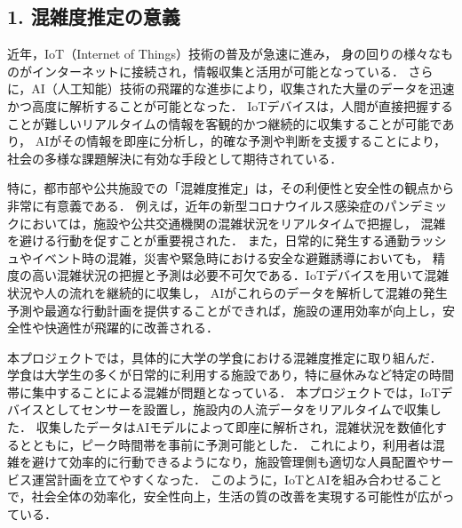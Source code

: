 \subsection*{1. 混雑度推定の意義}
近年，IoT（Internet of Things）技術の普及が急速に進み，
身の回りの様々なものがインターネットに接続され，情報収集と活用が可能となっている．
さらに，AI（人工知能）技術の飛躍的な進歩により，収集された大量のデータを迅速かつ高度に解析することが可能となった．
IoTデバイスは，人間が直接把握することが難しいリアルタイムの情報を客観的かつ継続的に収集することが可能であり，
AIがその情報を即座に分析し，的確な予測や判断を支援することにより，社会の多様な課題解決に有効な手段として期待されている．

特に，都市部や公共施設での「混雑度推定」は，その利便性と安全性の観点から非常に有意義である．
例えば，近年の新型コロナウイルス感染症のパンデミックにおいては，施設や公共交通機関の混雑状況をリアルタイムで把握し，
混雑を避ける行動を促すことが重要視された．
また，日常的に発生する通勤ラッシュやイベント時の混雑，災害や緊急時における安全な避難誘導においても，
精度の高い混雑状況の把握と予測は必要不可欠である．IoTデバイスを用いて混雑状況や人の流れを継続的に収集し，
AIがこれらのデータを解析して混雑の発生予測や最適な行動計画を提供することができれば，施設の運用効率が向上し，安全性や快適性が飛躍的に改善される．

本プロジェクトでは，具体的に大学の学食における混雑度推定に取り組んだ．
学食は大学生の多くが日常的に利用する施設であり，特に昼休みなど特定の時間帯に集中することによる混雑が問題となっている．
本プロジェクトでは，IoTデバイスとしてセンサーを設置し，施設内の人流データをリアルタイムで収集した．
収集したデータはAIモデルによって即座に解析され，混雑状況を数値化するとともに，ピーク時間帯を事前に予測可能とした．
これにより，利用者は混雑を避けて効率的に行動できるようになり，施設管理側も適切な人員配置やサービス運営計画を立てやすくなった．
このように，IoTとAIを組み合わせることで，社会全体の効率化，安全性向上，生活の質の改善を実現する可能性が広がっている．
%
